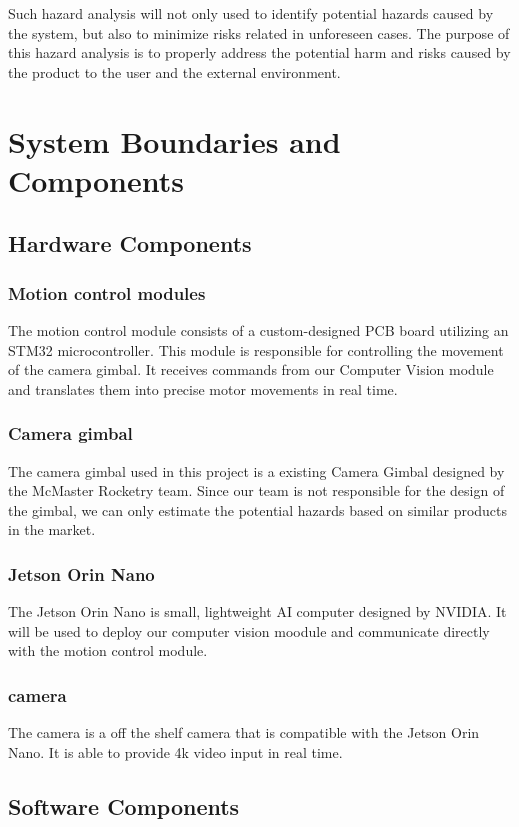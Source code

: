 \documentclass[11pt]{article}
\begin{document}
Such hazard analysis will not only used to identify potential hazards caused by the 
system, but also to minimize risks related in unforeseen cases. The purpose of this 
hazard analysis is to properly address the potential harm and risks caused by the 
product to the user and the external environment.

\section{System Boundaries and Components}

\subsection{Hardware Components}
\subsubsection{Motion control modules}
The motion control module consists of a custom-designed PCB board utilizing an STM32 
microcontroller. This module is responsible for controlling the movement of the camera
gimbal. It receives commands from our Computer Vision module and translates them into
precise motor movements in real time. 
\subsubsection{Camera gimbal}
The camera gimbal used in this project is a existing Camera Gimbal designed by the 
McMaster Rocketry team. Since our team is not responsible for the design of the gimbal, 
we can only estimate the potential hazards based on similar products in the market. 
\subsubsection{Jetson Orin Nano}
The Jetson Orin Nano is small, lightweight AI computer designed by NVIDIA. It will
be used to deploy our computer vision moodule and communicate directly with the motion
control module.
\subsubsection{camera}
The camera is a off the shelf camera that is compatible with the Jetson Orin Nano. It 
is able to provide 4k video input in real time. 

\subsection{Software Components}
\end{document}
